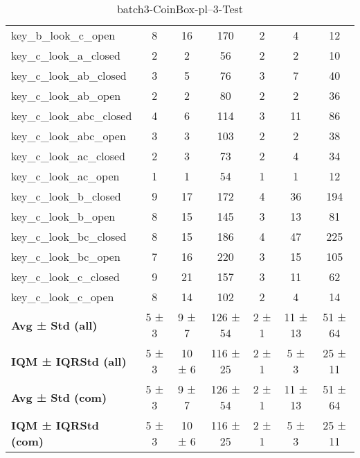 \begin{table}[!ht]
\begin{tabular}{l|ccc|ccc}
key\_b\_look\_c\_open & 8 & 16 & 170 & 2 & 4 & 12 \\
key\_c\_look\_a\_closed & 2 & 2 & 56 & 2 & 2 & 10 \\
key\_c\_look\_ab\_closed & 3 & 5 & 76 & 3 & 7 & 40 \\
key\_c\_look\_ab\_open & 2 & 2 & 80 & 2 & 2 & 36 \\
key\_c\_look\_abc\_closed & 4 & 6 & 114 & 3 & 11 & 86 \\
key\_c\_look\_abc\_open & 3 & 3 & 103 & 2 & 2 & 38 \\
key\_c\_look\_ac\_closed & 2 & 3 & 73 & 2 & 4 & 34 \\
key\_c\_look\_ac\_open & 1 & 1 & 54 & 1 & 1 & 12 \\
key\_c\_look\_b\_closed & 9 & 17 & 172 & 4 & 36 & 194 \\
key\_c\_look\_b\_open & 8 & 15 & 145 & 3 & 13 & 81 \\
key\_c\_look\_bc\_closed & 8 & 15 & 186 & 4 & 47 & 225 \\
key\_c\_look\_bc\_open & 7 & 16 & 220 & 3 & 15 & 105 \\
key\_c\_look\_c\_closed & 9 & 21 & 157 & 3 & 11 & 62 \\
key\_c\_look\_c\_open & 8 & 14 & 102 & 2 & 4 & 14 \\
\hline
\textbf{Avg ± Std (all)} & 5 ± 3 & 9 ± 7 & 126 ± 54 & 2 ± 1 & 11 ± 13 & 51 ± 64 \\
\textbf{IQM ± IQRStd (all)} & 5 ± 3 & 10 ± 6 & 116 ± 25 & 2 ± 1 & 5 ± 3 & 25 ± 11 \\
\textbf{Avg ± Std (com)} & 5 ± 3 & 9 ± 7 & 126 ± 54 & 2 ± 1 & 11 ± 13 & 51 ± 64 \\
\textbf{IQM ± IQRStd (com)} & 5 ± 3 & 10 ± 6 & 116 ± 25 & 2 ± 1 & 5 ± 3 & 25 ± 11 \\
\end{tabular}
\caption{batch3-CoinBox-pl--3-Test}
\label{tab:batch3_CoinBox_pl__3_comparison_test}
\end{table}
